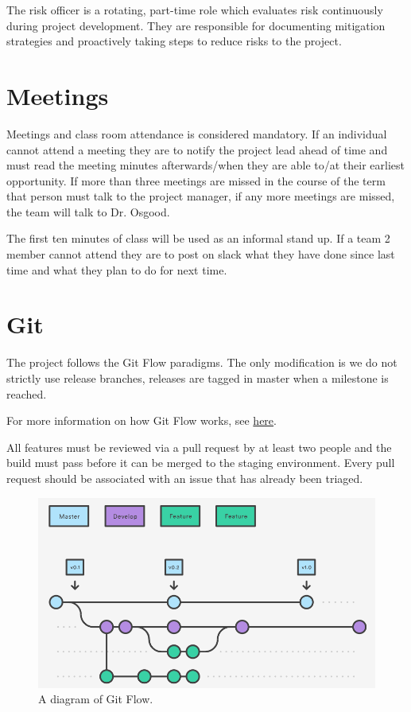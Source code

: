 \documentclass{scrreprt}
\begin{document}
The risk officer is a rotating, part-time role which evaluates
risk continuously during project development. They are responsible
for documenting mitigation strategies and proactively taking
steps to reduce risks to the project. 

\section{Meetings}

Meetings and class room attendance is considered mandatory. 
If an individual cannot attend a meeting they are to notify the project lead ahead of time and must read the meeting minutes afterwards/when they are able to/at their earliest opportunity. If more than three meetings are missed in the course of the term that person must talk to the project manager, if any more meetings are missed, the team will talk to Dr. Osgood.

The first ten minutes of class will be used as an informal stand up.
If a team 2 member cannot attend they are to post on slack what they have done since last time and what they plan to do for next time. 

\section{Git}

The project follows the Git Flow paradigms. The only
modification is we do not strictly use release branches, releases
are tagged in master when a milestone is reached. 

For more information on how Git Flow works, see \href{https://www.atlassian.com/git/tutorials/comparing-workflows/gitflow-workflow}{here}.

All features must be reviewed via a pull request by at least two
people and the build must pass before it can be merged to the staging
environment. Every pull request should be associated with an issue that
has already been triaged.

\begin{figure}[H]
    \includegraphics[width=\linewidth]{gitflow}
    \caption{A diagram of Git Flow.}
    \label{fig:gitflow}
\end{figure}
\end{document}
